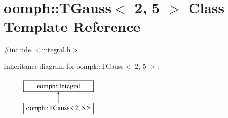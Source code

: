 \hypertarget{classoomph_1_1TGauss_3_012_00_015_01_4}{}\section{oomph\+:\+:T\+Gauss$<$ 2, 5 $>$ Class Template Reference}
\label{classoomph_1_1TGauss_3_012_00_015_01_4}


{\ttfamily \#include $<$integral.\+h$>$}

Inheritance diagram for oomph\+:\+:T\+Gauss$<$ 2, 5 $>$\+:\begin{figure}[H]
\begin{center}
\leavevmode
\includegraphics[height=2.000000cm]{classoomph_1_1TGauss_3_012_00_015_01_4}
\end{center}
\end{figure}
